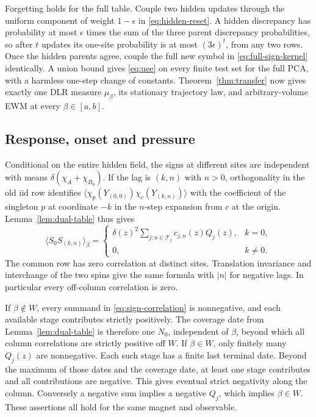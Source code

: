 Forgetting holds for the full table. Couple two hidden updates through the uniform component of weight \(1-\epsilon\) in \eqref{eq:hidden-reset}. A hidden discrepancy has probability at most \(\epsilon\) times the sum of the three parent discrepancy probabilities, so after \(t\) updates its one-site probability is at most \((3\epsilon)^t\), from any two rows. Once the hidden parents agree, couple the full new symbol in \eqref{eq:full-sign-kernel} identically. A union bound gives \eqref{eq:uee} on every finite test set for the full PCA, with a harmless one-step change of constants. Theorem~\ref{thm:transfer} now gives exactly one DLR measure \(\mu_\beta\), its stationary trajectory law, and arbitrary-volume EWM at every \(\beta\in[a,b]\).

\subsection{Response, onset and pressure}\label{sec:sign-proof}

Conditional on the entire hidden field, the signs at different sites are independent with means \(\delta(\chi_A+\chi_{B_0})\). If the lag is \((k,n)\) with \(n>0\), orthogonality in the old iid row identifies
\(\langle\chi_p(Y_{(0,0)})\chi_c(Y_{(k,n)})\rangle\)
with the coefficient of the singleton \(p\) at coordinate \(-k\) in the \(n\)-step expansion from \(c\) at the origin. Lemma~\ref{lem:dual-table} thus gives
\begin{equation}\label{eq:sign-correlation}
 \langle S_0S_{(k,n)}\rangle_\beta
 =\begin{cases}
 \displaystyle\delta(z)^2\sum_{j:n\in\mathcal T_j}c_{j,n}(z)Q_j(z),&k=0,\\
 0,&k\ne0.
 \end{cases}
\end{equation}
The common row has zero correlation at distinct sites. Translation invariance and interchange of the two spins give the same formula with \(|n|\) for negative lags. In particular every off-column correlation is zero.

If \(\beta\notin W\), every summand in \eqref{eq:sign-correlation} is nonnegative, and each available stage contributes strictly positively. The coverage date from Lemma~\ref{lem:dual-table} is therefore one \(N_0\), independent of \(\beta\), beyond which all column correlations are strictly positive off \(W\). If \(\beta\in W\), only finitely many \(Q_j(z)\) are nonnegative. Each such stage has a finite last terminal date. Beyond the maximum of those dates and the coverage date, at least one stage contributes and all contributions are negative. This gives eventual strict negativity along the column. Conversely a negative sum implies a negative \(Q_j\), which implies \(\beta\in W\). These assertions all hold for the same magnet and observable.

